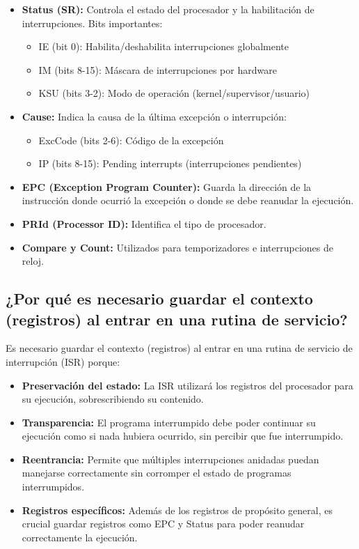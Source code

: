 \documentclass[12pt]{article}
\begin{document}
	\begin{itemize}
		\item \textbf{Status (SR):} Controla el estado del procesador y la habilitación de interrupciones. Bits importantes:
		\begin{itemize}
			\item IE (bit 0): Habilita/deshabilita interrupciones globalmente
			\item IM (bits 8-15): Máscara de interrupciones por hardware
			\item KSU (bits 3-2): Modo de operación (kernel/supervisor/usuario)
		\end{itemize}
		
		\item \textbf{Cause:} Indica la causa de la última excepción o interrupción:
		\begin{itemize}
			\item ExcCode (bits 2-6): Código de la excepción
			\item IP (bits 8-15): Pending interrupts (interrupciones pendientes)
		\end{itemize}
		
		\item \textbf{EPC (Exception Program Counter):} Guarda la dirección de la instrucción donde ocurrió la excepción o donde se debe reanudar la ejecución.
		
		\item \textbf{PRId (Processor ID):} Identifica el tipo de procesador.
		
		\item \textbf{Compare y Count:} Utilizados para temporizadores e interrupciones de reloj.
	\end{itemize}
	
	\subsection{¿Por qué es necesario guardar el contexto (registros) al entrar en una rutina de servicio?}
	
	Es necesario guardar el contexto (registros) al entrar en una rutina de servicio de interrupción (ISR) porque:
	
	\begin{itemize}
		\item \textbf{Preservación del estado:} La ISR utilizará los registros del procesador para su ejecución, sobrescribiendo su contenido.
		
		\item \textbf{Transparencia:} El programa interrumpido debe poder continuar su ejecución como si nada hubiera ocurrido, sin percibir que fue interrumpido.
		
		\item \textbf{Reentrancia:} Permite que múltiples interrupciones anidadas puedan manejarse correctamente sin corromper el estado de programas interrumpidos.
		
		\item \textbf{Registros específicos:} Además de los registros de propósito general, es crucial guardar registros como EPC y Status para poder reanudar correctamente la ejecución.
	\end{itemize}
	
\end{document}

